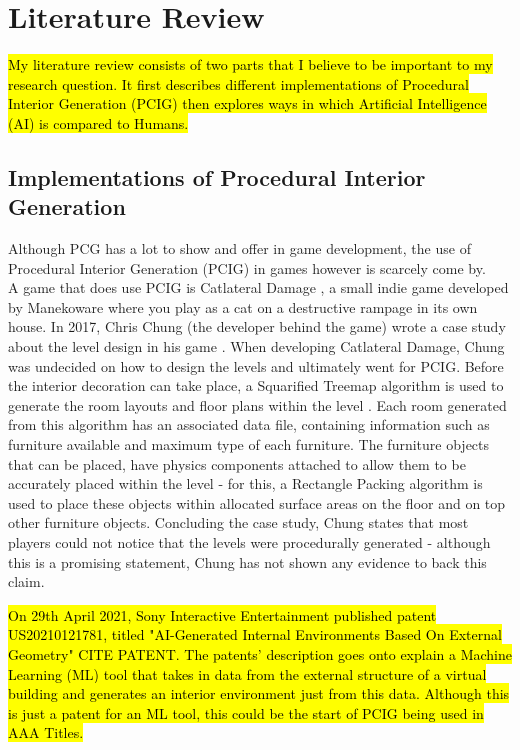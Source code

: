 \section{Literature Review}
\hl{My literature review consists of two parts that I believe to be important to my research question. It first describes different implementations of Procedural Interior Generation (PCIG) then explores ways in which Artificial Intelligence (AI) is compared to Humans.}

\subsection{Implementations of Procedural Interior Generation}
Although PCG has a lot to show and offer in game development, the use of Procedural Interior Generation (PCIG) in games however is scarcely come by.
\\
A game that does use PCIG is Catlateral Damage \cite{game:catlateral}, a small indie game developed by Manekoware where you play as a cat on a destructive rampage in its own house. In 2017, Chris Chung (the developer behind the game) wrote a case study about the level design in his game \cite[Chapter~6]{pcg_in_gd}. When developing Catlateral Damage, Chung was undecided on how to design the levels and ultimately went for PCIG\cite[Chapter~6]{pcg_in_gd}. Before the interior decoration can take place, a Squarified Treemap algorithm is used to generate the room layouts and floor plans within the level \cite{squarified-treemap}. Each room generated from this algorithm has an associated data file, containing information such as furniture available and maximum type of each furniture. The furniture objects that can be placed, have physics components attached to allow them to be accurately placed within the level - for this, a Rectangle Packing algorithm \cite{rectangle-packing} is used to place these objects within allocated surface areas on the floor and on top other furniture objects. Concluding the case study, Chung states that most players could not notice that the levels were procedurally generated - although this is a promising statement, Chung has not shown any evidence to back this claim.

\bigskip
\hl{On 29th April 2021, Sony Interactive Entertainment published patent US20210121781, titled "AI-Generated Internal Environments Based On External Geometry" CITE PATENT. The patents' description goes onto explain a Machine Learning (ML) tool that takes in data from the external structure of a virtual building and generates an interior environment just from this data. Although this is just a patent for an ML tool, this could be the start of PCIG being used in AAA Titles.}

